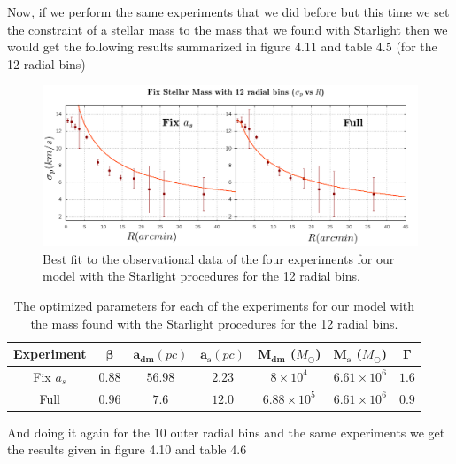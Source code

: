 Now, if we perform the same experiments that we did before but this time we set the constraint of a stellar mass to the mass that we found with Starlight then we would get the following results summarized in figure 4.11 and table 4.5 (for the 12 radial bins)

\begin{figure}[H]
\centering
\includegraphics[width=15cm]{images/Starlight_2.png}
\caption[Best fit of our model with the mass found with the Starlight procedures for the 12 radial bins]{Best fit to the observational data of the four experiments for our model with the Starlight procedures for the 12 radial bins.}
\end{figure}

\begin{table}[H]
\begin{center}
\begin{tabular}{| c| c| c| c| c| c| c|}
    \hline
    \textbf{Experiment} & $\mathbf{\beta}$ & $\mathbf{a_{dm}} (pc)$ & $\mathbf{a_{s}} (pc)$ & $\mathbf{M_{dm}}$ ($M_{\odot}$) & $\mathbf{M_{s}}$ ($M_{\odot}$) & $\mathbf{\Gamma}$\\ \hline
	Fix $a_s$ &	$0.88$ &	$56.98$ &	$2.23$ &	$8 \times 10^{4}$ &	$6.61 \times 10 ^{6}$ &	$1.6$\\ \hline
	Full &	$0.96$ &	$7.6$ &	$12.0$ &	$6.88 \times 10^{5}$ &	$6.61 \times 10^{6}$ &	$0.9$\\ \hline
  \end{tabular} 
\caption[Optimized parameters for our model with the mass found with the Starlight procedures for the 12 radial bins.]{The optimized parameters for each of the experiments for our model with the mass found with the Starlight procedures for the 12 radial bins.}
\end{center}
\end{table}

And doing it again for the 10 outer radial bins and the same experiments we get the results given in figure 4.10 and table 4.6

